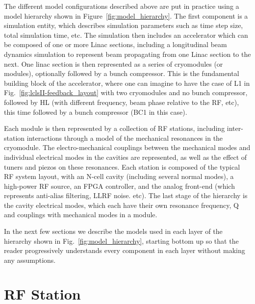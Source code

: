 \documentclass[a4paper,12pt]{article}
\begin{document}
The different model configurations described above are put in practice using a model hierarchy shown in Figure~\ref{fig:model_hierarchy}. The first component is a simulation entity, which describes simulation parameters such as time step size, total simulation time, etc. The simulation then includes an accelerator which can be composed of one or more Linac sections, including a longitudinal beam dynamics simulation to represent beam propagating from one Linac section to the next. One linac section is then represented as a series of cryomodules (or modules), optionally followed by a bunch compressor. This is the fundamental building block of the accelerator, where one can imagine to have the case of L1 in Fig.~\ref{fig:lclsII-feedback_layout} with two cryomodules and no bunch compressor, followed by HL (with different frequency, beam phase relative to the RF, etc), this time followed by a bunch compressor (BC1 in this case).

Each module is then represented by a collection of RF stations, including inter-station interactions through a model of the mechanical resonances in the cryomodule. The electro-mechanical couplings between the mechanical modes and individual electrical modes in the cavities are represented, as well as the effect of tuners and piezos on these resonances. Each station is composed of the typical RF system layout, with an N-cell cavity (including several normal modes), a high-power RF source, an FPGA controller, and the analog front-end (which represents anti-alias filtering, LLRF noise. etc). The last stage of the hierarchy is the cavity electrical modes, which each have their own resonance frequency, Q and couplings with mechanical modes in a module.

In the next few sections we describe the models used in each layer of the hierarchy shown in Fig.~\ref{fig:model_hierarchy}, starting bottom up so that the reader progressively understands every component in each layer without making any assumptions.

\newpage

\section{RF Station}
\end{document}
